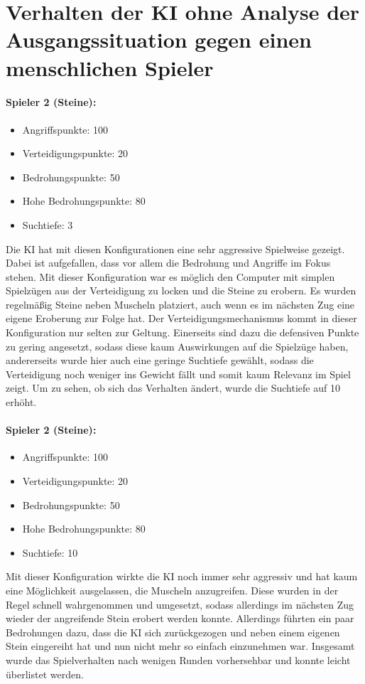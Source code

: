 \section{Verhalten der KI ohne Analyse der Ausgangssituation gegen einen menschlichen Spieler}
\label{ch:Evaluierung:sec:KIvsHuman}
\paragraph{Spieler 2 (Steine):}
\begin{itemize}
	\item Angriffspunkte: 100
	\item Verteidigungspunkte: 20
	\item Bedrohungspunkte: 50
	\item Hohe Bedrohungspunkte: 80
	\item Suchtiefe: 3
\end{itemize}
Die KI hat mit diesen Konfigurationen eine sehr aggressive Spielweise gezeigt. Dabei ist aufgefallen, dass vor allem die Bedrohung und Angriffe im Fokus stehen. Mit dieser Konfiguration war es möglich den Computer mit simplen Spielzügen aus der Verteidigung zu locken und die Steine zu erobern. Es wurden regelmäßig Steine neben Muscheln platziert, auch wenn es im nächsten Zug eine eigene Eroberung zur Folge hat. Der Verteidigungsmechanismus kommt in dieser Konfiguration nur selten zur Geltung. Einerseits sind dazu die defensiven Punkte zu gering angesetzt, sodass diese kaum Auswirkungen auf die Spielzüge haben, andererseits wurde hier auch eine geringe Suchtiefe gewählt, sodass die Verteidigung noch weniger ins Gewicht fällt und somit kaum Relevanz im Spiel zeigt. Um zu sehen, ob sich das Verhalten ändert, wurde die Suchtiefe auf 10 erhöht.

\paragraph{Spieler 2 (Steine):}
\begin{itemize}
	\item Angriffspunkte: 100
	\item Verteidigungspunkte: 20
	\item Bedrohungspunkte: 50
	\item Hohe Bedrohungspunkte: 80
	\item Suchtiefe: 10
\end{itemize}

Mit dieser Konfiguration wirkte die KI noch immer sehr aggressiv und hat kaum eine Möglichkeit ausgelassen, die Muscheln anzugreifen. Diese wurden in der Regel schnell wahrgenommen und umgesetzt, sodass allerdings im nächsten Zug wieder der angreifende Stein erobert werden konnte. Allerdings führten ein paar Bedrohungen dazu, dass die KI sich zurückgezogen und neben einem eigenen Stein eingereiht hat und nun nicht mehr so einfach einzunehmen war. Insgesamt wurde das Spielverhalten nach wenigen Runden vorhersehbar und konnte leicht überlistet werden.

